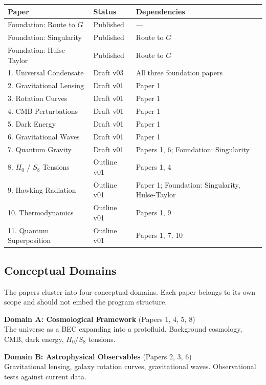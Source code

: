 \documentclass[11pt,a4paper]{article}
\begin{document}
\begin{center}
\begin{tabular}{llp{8cm}}
\toprule
\textbf{Paper} & \textbf{Status} & \textbf{Dependencies} \\
\midrule
Foundation: Route to $G$ & Published & --- \\
Foundation: Singularity & Published & Route to $G$ \\
Foundation: Hulse-Taylor & Published & Route to $G$ \\
\midrule
1. Universal Condensate & Draft v03 & All three foundation papers \\
2. Gravitational Lensing & Draft v01 & Paper 1 \\
3. Rotation Curves & Draft v01 & Paper 1 \\
4. CMB Perturbations & Draft v01 & Paper 1 \\
5. Dark Energy & Draft v01 & Paper 1 \\
6. Gravitational Waves & Draft v01 & Paper 1 \\
7. Quantum Gravity & Draft v01 & Papers 1, 6; Foundation: Singularity \\
8. $H_0$ / $S_8$ Tensions & Outline v01 & Papers 1, 4 \\
9. Hawking Radiation & Outline v01 & Paper 1; Foundation: Singularity, Hulse-Taylor \\
10. Thermodynamics & Outline v01 & Papers 1, 9 \\
11. Quantum Superposition & Outline v01 & Papers 1, 7, 10 \\
\bottomrule
\end{tabular}
\end{center}

\subsection{Conceptual Domains}

The papers cluster into four conceptual domains. Each paper belongs to its own scope and should not embed the program structure.

\textbf{Domain A: Cosmological Framework} (Papers 1, 4, 5, 8)\\
The universe as a BEC expanding into a protofluid. Background cosmology, CMB, dark energy, $H_0$/$S_8$ tensions.

\textbf{Domain B: Astrophysical Observables} (Papers 2, 3, 6)\\
Gravitational lensing, galaxy rotation curves, gravitational waves. Observational tests against current data.
\end{document}
